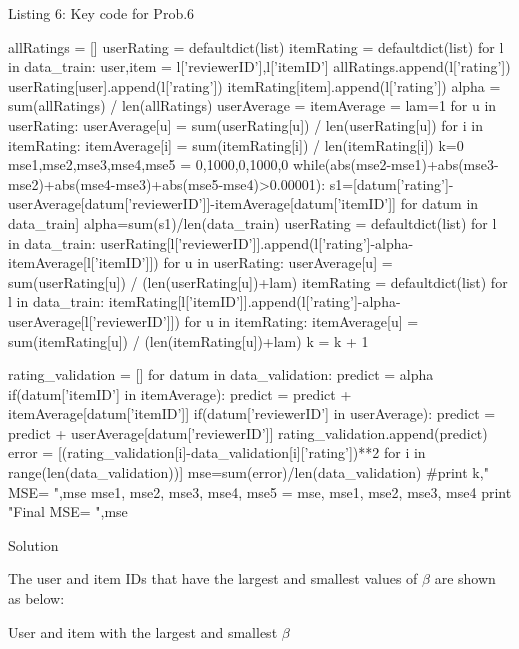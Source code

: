 \documentclass{assignment}
\begin{document}
\begin{problemlist}
\begin{center} 
Listing 6: Key code for Prob.6
\end{center}
\begin{python}
allRatings = []
userRating = defaultdict(list)
itemRating = defaultdict(list)
for l in data_train:
    user,item = l['reviewerID'],l['itemID']
    allRatings.append(l['rating'])
    userRating[user].append(l['rating'])
    itemRating[item].append(l['rating'])
alpha = sum(allRatings) / len(allRatings)
userAverage = {}
itemAverage = {}
lam=1
for u in userRating:
    userAverage[u] = sum(userRating[u]) / len(userRating[u])
for i in itemRating:
    itemAverage[i] = sum(itemRating[i]) / len(itemRating[i])
k=0
mse1,mse2,mse3,mse4,mse5 = 0,1000,0,1000,0
while(abs(mse2-mse1)+abs(mse3-mse2)+abs(mse4-mse3)+abs(mse5-mse4)>0.00001):
    s1=[datum['rating']-userAverage[datum['reviewerID']]-itemAverage[datum['itemID']] for datum in data_train]
    alpha=sum(s1)/len(data_train)
    userRating = defaultdict(list)
    for l in data_train:
        userRating[l['reviewerID']].append(l['rating']-alpha-itemAverage[l['itemID']])
    for u in userRating:
        userAverage[u] = sum(userRating[u]) / (len(userRating[u])+lam)
    itemRating = defaultdict(list)
    for l in data_train:
        itemRating[l['itemID']].append(l['rating']-alpha-userAverage[l['reviewerID']])
    for u in itemRating:
        itemAverage[u] = sum(itemRating[u]) / (len(itemRating[u])+lam)
    k = k + 1

    rating_validation = []
    for datum in data_validation:
        predict = alpha
        if(datum['itemID'] in itemAverage):
            predict = predict + itemAverage[datum['itemID']]
        if(datum['reviewerID'] in userAverage):
            predict = predict + userAverage[datum['reviewerID']]
        rating_validation.append(predict)
    error = [(rating_validation[i]-data_validation[i]['rating'])**2 for i in range(len(data_validation))]
    mse=sum(error)/len(data_validation)
    #print k," MSE= ",mse
    mse1, mse2, mse3, mse4, mse5 = mse, mse1, mse2, mse3, mse4
print "Final MSE= ",mse
\end{python}

\pbitem Solution
\vspace{2ex}

\begin{table}[h]
The user and item IDs that have the largest and smallest values of $\beta$ are shown as below:

\vspace{2ex}
\centering
\caption{User and item with the largest and smallest $\beta$}
\vspace{1ex}


\end{table}
\end{problemlist}
\end{document}
